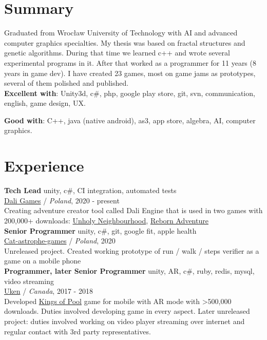\documentclass[12pt,a4paper]{article}
\begin{document}
\begin{multicols}{2}

\centering
\section*{Summary}
\justifying

	Graduated from Wrocław University of Technology with AI and advanced computer graphics specialties. My thesis was based on fractal structures and genetic algorithms. During that time we learned c++ and wrote several experimental programs in it. After that worked as a programmer for 11 years (8 years in game dev). I have created 23 games, most on game jams as prototypes, several of them polished and published.
	\\

	\textbf{Excellent with}: Unity3d, c\#, php, google play store, git, svn, communication, english, game design, UX.

	\textbf{Good with}: C++, java (native android), as3, app store, algebra, AI, computer graphics.

\centering
\section*{Experience }
\justifying
	 {\large \textbf{Tech Lead}}  \hfill \textcolor{techColor}{unity, c\#, CI integration, automated tests} \\
	{\href{https://dali.games/}{Dali Games}}  / \textit{Poland}, 2020 - present  \\
	Creating adventure creator tool called Dali Engine that is used in two games with 200,000+ downloads: {\href{https://play.google.com/store/apps/details?id=games.dali.adventure.neighborhood.unholy}{Unholy Neighbourhood}}, {\href{https://play.google.com/store/apps/details?id=games.dali.adventure.reborn}{Reborn Adventure}} \\

	{\large \textbf{Senior Programmer}} \hfill \textcolor{techColor}{unity, c\#, git, google fit, apple health} \\
	{\href{https://cat-astrophe-games.com/}{Cat-astrophe-games}}  / \textit{Poland}, 2020 \\
	Unreleased project. Created working prototype of run / walk / steps verifier as a game on a mobile phone   \\

	{\large \textbf{Programmer, later Senior Programmer}} \hfill \textcolor{techColor}{unity, AR, c\#, ruby, redis, mysql, video streaming} \\
	{\href{https://www.uken.com/}{Uken}}  / \textit{Canada}, 2017 - 2018 \\
	Developed {\href{https://play.google.com/store/apps/details?id=com.uken.pool}{Kings of Pool}} game for mobile with AR mode with \textgreater 500,000 downloads. Duties involved developing game in every aspect. Later unreleased project: duties involved working on video player streaming over internet and regular contact with 3rd party representatives. \\


\end{multicols}
\end{document}
